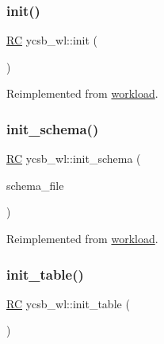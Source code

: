 \subsubsection{\texorpdfstring{init()}{init()}}
{\footnotesize\ttfamily \hyperlink{global_8h_a78c49a674c810fdd03d20432f7be864a}{RC} ycsb\+\_\+wl\+::init (\begin{DoxyParamCaption}{ }\end{DoxyParamCaption})\hspace{0.3cm}{\ttfamily [virtual]}}



Reimplemented from \hyperlink{classworkload_a7cef7a7101c78e10082c99356e77a57c}{workload}.

\mbox{\label{classycsb__wl_a3f1937f438c251831694b39b6e9dc36d}} 
\subsubsection{\texorpdfstring{init\+\_\+schema()}{init\_schema()}}
{\footnotesize\ttfamily \hyperlink{global_8h_a78c49a674c810fdd03d20432f7be864a}{RC} ycsb\+\_\+wl\+::init\+\_\+schema (\begin{DoxyParamCaption}\item[{std\+::string}]{schema\+\_\+file }\end{DoxyParamCaption})\hspace{0.3cm}{\ttfamily [virtual]}}



Reimplemented from \hyperlink{classworkload_a12ce1550f8e398871961c6ff116c11d3}{workload}.

\mbox{\label{classycsb__wl_a2e1e8d6e68e5312a82cfe09ec4bb26a6}} 
\subsubsection{\texorpdfstring{init\+\_\+table()}{init\_table()}}
{\footnotesize\ttfamily \hyperlink{global_8h_a78c49a674c810fdd03d20432f7be864a}{RC} ycsb\+\_\+wl\+::init\+\_\+table (\begin{DoxyParamCaption}{ }\end{DoxyParamCaption})\hspace{0.3cm}{\ttfamily [virtual]}}




